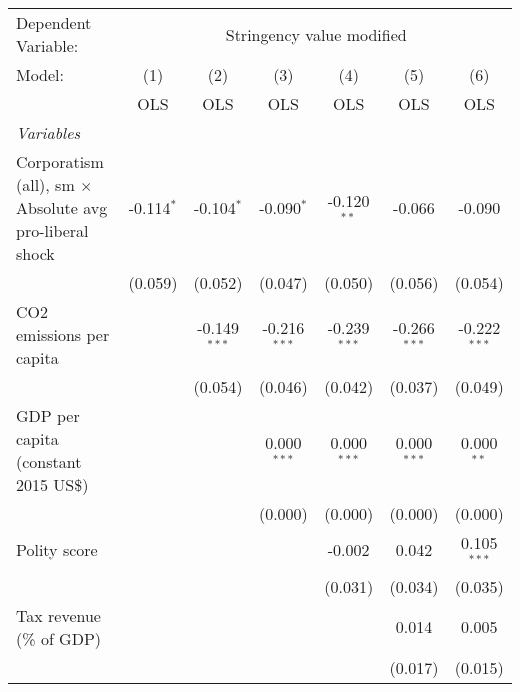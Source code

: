 
\begingroup
\centering
\begin{tabular}{lcccccc}
   \toprule
   Dependent Variable: & \multicolumn{6}{c}{Stringency value modified}\\
   Model:                                                         & (1)          & (2)            & (3)            & (4)            & (5)            & (6)\\  
                                                                  &  OLS         & OLS            & OLS            & OLS            & OLS            & OLS\\  
   \midrule
   \emph{Variables}\\
   Corporatism (all), sm $\times$ Absolute avg pro-liberal shock  & -0.114$^{*}$ & -0.104$^{*}$   & -0.090$^{*}$   & -0.120$^{**}$  & -0.066         & -0.090\\   
                                                                  & (0.059)      & (0.052)        & (0.047)        & (0.050)        & (0.056)        & (0.054)\\   
   CO2 emissions per capita                                       &              & -0.149$^{***}$ & -0.216$^{***}$ & -0.239$^{***}$ & -0.266$^{***}$ & -0.222$^{***}$\\   
                                                                  &              & (0.054)        & (0.046)        & (0.042)        & (0.037)        & (0.049)\\   
   GDP per capita (constant 2015 US\$)                            &              &                & 0.000$^{***}$  & 0.000$^{***}$  & 0.000$^{***}$  & 0.000$^{**}$\\   
                                                                  &              &                & (0.000)        & (0.000)        & (0.000)        & (0.000)\\   
   Polity score                                                   &              &                &                & -0.002         & 0.042          & 0.105$^{***}$\\   
                                                                  &              &                &                & (0.031)        & (0.034)        & (0.035)\\   
   Tax revenue (\% of GDP)                                        &              &                &                &                & 0.014          & 0.005\\   
                                                                  &              &                &                &                & (0.017)        & (0.015)\\   

\end{tabular}
